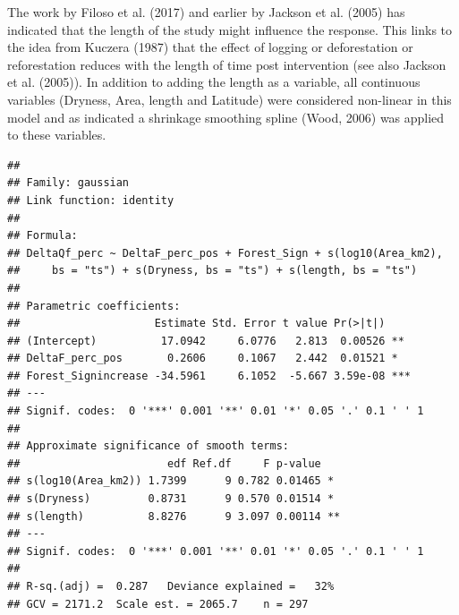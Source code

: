 \documentclass[]{elsarticle} %
\begin{document}
The work by Filoso et al. (2017) and earlier by Jackson et al. (2005)
has indicated that the length of the study might influence the response.
This links to the idea from Kuczera (1987) that the effect of logging or
deforestation or reforestation reduces with the length of time post
intervention (see also Jackson et al. (2005)). In addition to adding the
length as a variable, all continuous variables (Dryness, Area, length
and Latitude) were considered non-linear in this model and as indicated
a shrinkage smoothing spline (Wood, 2006) was applied to these
variables.

\begin{verbatim}
## 
## Family: gaussian 
## Link function: identity 
## 
## Formula:
## DeltaQf_perc ~ DeltaF_perc_pos + Forest_Sign + s(log10(Area_km2), 
##     bs = "ts") + s(Dryness, bs = "ts") + s(length, bs = "ts")
## 
## Parametric coefficients:
##                     Estimate Std. Error t value Pr(>|t|)    
## (Intercept)          17.0942     6.0776   2.813  0.00526 ** 
## DeltaF_perc_pos       0.2606     0.1067   2.442  0.01521 *  
## Forest_Signincrease -34.5961     6.1052  -5.667 3.59e-08 ***
## ---
## Signif. codes:  0 '***' 0.001 '**' 0.01 '*' 0.05 '.' 0.1 ' ' 1
## 
## Approximate significance of smooth terms:
##                       edf Ref.df     F p-value   
## s(log10(Area_km2)) 1.7399      9 0.782 0.01465 * 
## s(Dryness)         0.8731      9 0.570 0.01514 * 
## s(length)          8.8276      9 3.097 0.00114 **
## ---
## Signif. codes:  0 '***' 0.001 '**' 0.01 '*' 0.05 '.' 0.1 ' ' 1
## 
## R-sq.(adj) =  0.287   Deviance explained =   32%
## GCV = 2171.2  Scale est. = 2065.7    n = 297
\end{verbatim}
\end{document}

